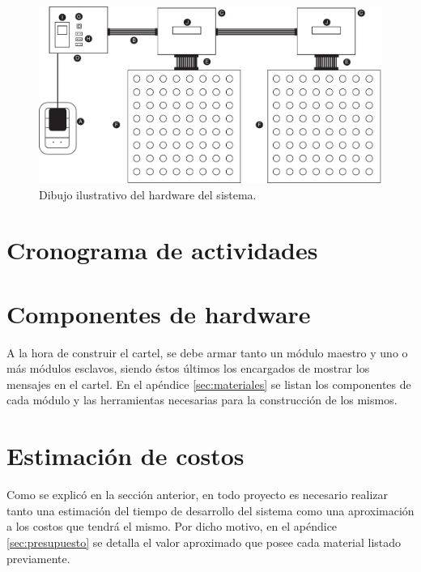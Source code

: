 	\begin{figure}[ht!]
		\begin{center}
			\centering
			\includegraphics[width=\linewidth]{imagenes/dibujo-fisico.pdf}
			\caption{Dibujo ilustrativo del hardware del sistema.}
			\label{fig:dibujo-real}
		\end{center}
	\end{figure}


\section{Cronograma de actividades}


\section{Componentes de hardware}
A la hora de construir el cartel, se debe armar tanto un módulo maestro y uno o más módulos esclavos, siendo éstos últimos los encargados de mostrar los mensajes en el cartel.
En el apéndice \ref{sec:materiales} se listan los componentes de cada módulo y las herramientas necesarias para la construcción de los mismos.


\section{Estimación de costos}
Como se explicó en la sección anterior, en todo proyecto es necesario realizar tanto una estimación del tiempo de desarrollo del sistema como una aproximación a los costos que tendrá el mismo.
Por dicho motivo, en el apéndice \ref{sec:presupuesto} se detalla el valor aproximado que posee cada material listado previamente.